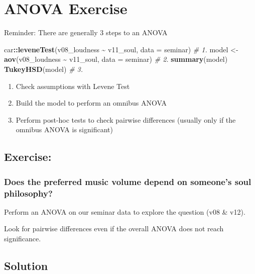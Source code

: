 \documentclass[
]{book}
\newenvironment{Shaded}{\begin{snugshade}}{\end{snugshade}}
\newcommand{\AttributeTok}[1]{\textcolor[rgb]{0.13,0.29,0.53}{#1}}
\newcommand{\CommentTok}[1]{\textcolor[rgb]{0.56,0.35,0.01}{\textit{#1}}}
\newcommand{\FunctionTok}[1]{\textcolor[rgb]{0.13,0.29,0.53}{\textbf{#1}}}
\newcommand{\NormalTok}[1]{#1}
\newcommand{\OtherTok}[1]{\textcolor[rgb]{0.56,0.35,0.01}{#1}}
\newcommand{\SpecialCharTok}[1]{\textcolor[rgb]{0.81,0.36,0.00}{\textbf{#1}}}
\providecommand{\tightlist}{%
  \setlength{\itemsep}{0pt}\setlength{\parskip}{0pt}}
\begin{document}
\section{ANOVA Exercise}\label{anova-exercise}

Reminder: There are generally 3 steps to an ANOVA

\begin{Shaded}
\begin{Highlighting}[]
\NormalTok{car}\SpecialCharTok{::}\FunctionTok{leveneTest}\NormalTok{(v08\_loudness }\SpecialCharTok{\textasciitilde{}}\NormalTok{ v11\_soul, }\AttributeTok{data =}\NormalTok{ seminar) }\CommentTok{\# 1.}
\NormalTok{model }\OtherTok{\textless{}{-}} \FunctionTok{aov}\NormalTok{(v08\_loudness }\SpecialCharTok{\textasciitilde{}}\NormalTok{ v11\_soul, }\AttributeTok{data =}\NormalTok{ seminar) }\CommentTok{\# 2.}
\FunctionTok{summary}\NormalTok{(model)}
\FunctionTok{TukeyHSD}\NormalTok{(model) }\CommentTok{\# 3.}
\end{Highlighting}
\end{Shaded}

\begin{enumerate}
\def\labelenumi{\arabic{enumi}.}
\tightlist
\item
  Check assumptions with Levene Test
\item
  Build the model to perform an omnibus ANOVA
\item
  Perform post-hoc tests to check pairwise differences (usually only if the omnibus ANOVA is significant)
\end{enumerate}

\subsection{Exercise:}\label{exercise-10}

\subsubsection{\texorpdfstring{Does the preferred music volume depend on someone's soul philosophy? }{Does the preferred music volume depend on someone's soul philosophy? }}\label{does-the-preferred-music-volume-depend-on-someones-soul-philosophy}

Perform an ANOVA on our seminar data to explore the question (v08 \& v12).

Look for pairwise differences even if the overall ANOVA does not reach significance.

\subsection{\texorpdfstring{Solution }{Solution }}\label{solution-14}
\end{document}
